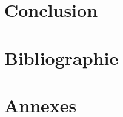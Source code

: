 \documentclass[a4paper, 12pt]{article}
\begin{document}
\newpage
\part{Conclusion}


\newpage
\part*{Bibliographie}



\newpage
\part*{Annexes}

\end{document}
